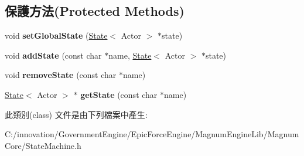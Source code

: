 \subsection*{保護方法(Protected Methods)}
\begin{DoxyCompactItemize}
\item 
void {\bfseries set\+Global\+State} (\hyperlink{class_i_dream_sky_1_1_state}{State}$<$ Actor $>$ $\ast$state)\hypertarget{class_i_dream_sky_1_1_state_machine_ab890f12b8bd1dc2f3d5bd25d19a380b6}{}\label{class_i_dream_sky_1_1_state_machine_ab890f12b8bd1dc2f3d5bd25d19a380b6}

\item 
void {\bfseries add\+State} (const char $\ast$name, \hyperlink{class_i_dream_sky_1_1_state}{State}$<$ Actor $>$ $\ast$state)\hypertarget{class_i_dream_sky_1_1_state_machine_a370493ff8caa61008b11f879c9f0f9bf}{}\label{class_i_dream_sky_1_1_state_machine_a370493ff8caa61008b11f879c9f0f9bf}

\item 
void {\bfseries remove\+State} (const char $\ast$name)\hypertarget{class_i_dream_sky_1_1_state_machine_afedbf4ab7789d196f11213555c241d27}{}\label{class_i_dream_sky_1_1_state_machine_afedbf4ab7789d196f11213555c241d27}

\item 
\hyperlink{class_i_dream_sky_1_1_state}{State}$<$ Actor $>$ $\ast$ {\bfseries get\+State} (const char $\ast$name)\hypertarget{class_i_dream_sky_1_1_state_machine_a41c926288fa6abbe554f0761d87b4ed6}{}\label{class_i_dream_sky_1_1_state_machine_a41c926288fa6abbe554f0761d87b4ed6}

\end{DoxyCompactItemize}


此類別(class) 文件是由下列檔案中產生\+:\begin{DoxyCompactItemize}
\item 
C\+:/innovation/\+Government\+Engine/\+Epic\+Force\+Engine/\+Magnum\+Engine\+Lib/\+Magnum\+Core/State\+Machine.\+h\end{DoxyCompactItemize}
